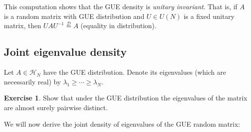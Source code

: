 \documentclass[letterpaper,11pt,oneside,reqno]{amsart}
\numberwithin{equation}{section}
\theoremstyle{definition}
\newtheorem{exercise}[proposition]{Exercise}
\begin{document}
This computation shows that the GUE density
is \emph{unitary invariant}. That is, if $A$ is a random matrix with GUE distribution 
and $U\in U(N)$ is a fixed unitary matrix, 
then $U A U^{-1}\stackrel{\mathcal D}{=}A$ (equality in distribution).


\subsection{Joint eigenvalue density} %
\label{sub:joint_eigenvalue_density}

Let $A\in\mathcal H_N$ have the GUE distribution.
Denote its 
eigenvalues (which are necessarily real) by $\lambda_1\ge\cdots\ge\lambda_N$.

\begin{exercise}
	Show that under the GUE distribution the eigenvalues of the matrix
	are almost surely pairwise distinct.
\end{exercise}

We will now derive the joint density of eigenvalues of the GUE random matrix:
\end{document}
